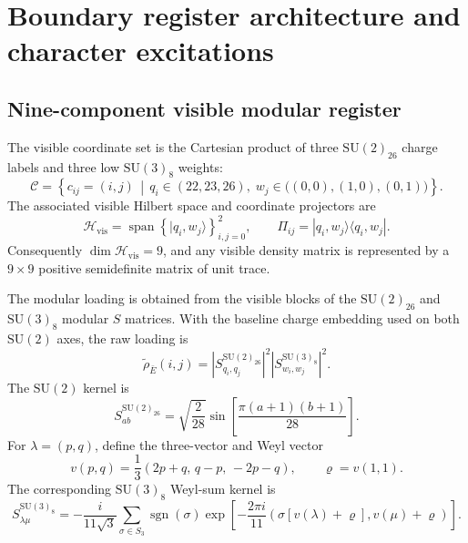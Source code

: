 \section{Boundary register architecture and character excitations}\label{sec:boundary-register}

\subsection{Nine-component visible modular register}

The visible coordinate set is the Cartesian product of three \(\mathrm{SU}(2)_{26}\) charge labels and three low \(\mathrm{SU}(3)_8\) weights:
\begin{equation}
  \mathcal C
  =
  \left\{
    c_{ij}=(i,j)
    \,\middle|\,
    q_i\in(22,23,26),
    \;
    w_j\in\bigl((0,0),(1,0),(0,1)\bigr)
  \right\}.
  \label{eq:visible-register-set}
\end{equation}
The associated visible Hilbert space and coordinate projectors are
\begin{equation}
  \mathcal H_{\mathrm{vis}}
  =
  \operatorname{span}
  \left\{
    |q_i,w_j\rangle
  \right\}_{i,j=0}^{2},
  \qquad
  \Pi_{ij}
  =
  |q_i,w_j\rangle
  \langle q_i,w_j|.
  \label{eq:visible-hilbert-space}
\end{equation}
Consequently \(\dim\mathcal H_{\mathrm{vis}}=9\), and any visible density matrix is represented by a \(9\times9\) positive semidefinite matrix of unit trace.

The modular loading is obtained from the visible blocks of the \(\mathrm{SU}(2)_{26}\) and \(\mathrm{SU}(3)_8\) modular \(S\) matrices.  With the baseline charge embedding used on both \(\mathrm{SU}(2)\) axes, the raw loading is
\begin{equation}
  \widetilde{\rho}_{\bar E}(i,j)
  =
  \left|
    S^{\mathrm{SU}(2)_{26}}_{q_i,q_j}
  \right|^2
  \left|
    S^{\mathrm{SU}(3)_8}_{w_i,w_j}
  \right|^2.
  \label{eq:raw-visible-register-loading}
\end{equation}
The \(\mathrm{SU}(2)\) kernel is
\begin{equation}
  S^{\mathrm{SU}(2)_{26}}_{ab}
  =
  \sqrt{\frac{2}{28}}
  \sin\left[
    \frac{\pi(a+1)(b+1)}{28}
  \right].
  \label{eq:su2-modular-kernel-full}
\end{equation}
For \(\lambda=(p,q)\), define the three-vector and Weyl vector
\begin{equation}
  v(p,q)
  =
  \frac{1}{3}
  \left(
    2p+q,\,
    q-p,\,
    -2p-q
  \right),
  \qquad
  \varrho=v(1,1).
  \label{eq:su3-weight-vector}
\end{equation}
The corresponding \(\mathrm{SU}(3)_8\) Weyl-sum kernel is
\begin{equation}
  S^{\mathrm{SU}(3)_8}_{\lambda\mu}
  =
  -\frac{i}{11\sqrt{3}}
  \sum_{\sigma\in S_3}
  \operatorname{sgn}(\sigma)
  \exp\left[
    -\frac{2\pi i}{11}
    \left(
      \sigma[v(\lambda)+\varrho],
      v(\mu)+\varrho
    \right)
  \right].
  \label{eq:su3-modular-kernel-full}
\end{equation}

